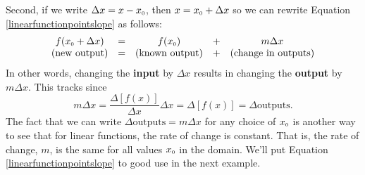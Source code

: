 \documentclass{ximera}
\begin{document}
Second, if we write $\Delta x = x - x_{\mbox{\tiny $0$}}$, then  $x = x_{\mbox{\tiny $0$}} + \Delta x$  so we can rewrite Equation \ref{linearfunctionpointslope}  as follows: \[ \begin{array}{ccccc}
 f(x_{\mbox{\tiny $0$}} + \Delta x) & = & f(x_{\mbox{\tiny $0$}}) & + & m \Delta x \\
 (\text{new output}) & = & (\text{known output}) & +&  (\text{change in outputs}) \\ \end{array} \] In other words, changing the \textbf{input} by $\Delta x$ results in changing the \textbf{output} by $m \Delta x$.  This tracks since \[ m \Delta x  = \dfrac{\Delta [f(x)]}{\Delta x} \Delta x =  \Delta[f(x)]  = \Delta \text{outputs}. \] The fact that we can write $\Delta \text{outputs} = m \Delta x$ for any choice of $x_{\mbox{\tiny $0$}}$ is another way to see that for linear functions, the rate of change is constant.  That is, the rate of change, $m$,  is the same for all values $x_{\mbox{\tiny $0$}}$ in the domain. We'll put Equation \ref{linearfunctionpointslope} to good use in the next example.
 
\end{document}
